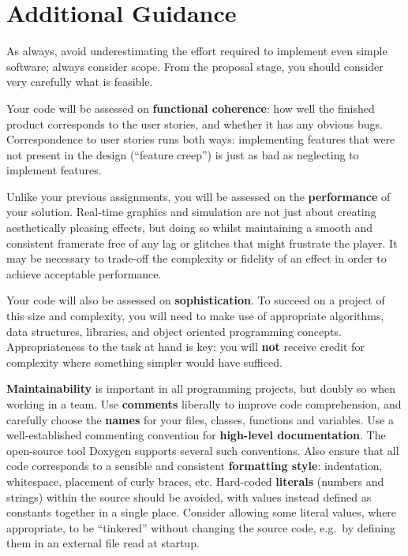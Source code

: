 \documentclass{../../fal_assignment}
\begin{document}
\section*{Additional Guidance}

As always, avoid underestimating the effort required to implement even simple software; always consider scope.
From the proposal stage, you should consider very carefully what is feasible.

Your code will be assessed on \textbf{functional coherence}:
how well the finished product corresponds to the user stories,
and whether it has any obvious bugs.
Correspondence to user stories runs both ways:
implementing features that were not present in the design (``feature creep'')
is just as bad as neglecting to implement features.

Unlike your previous assignments,
you will be assessed on the \textbf{performance} of your solution.
Real-time graphics and simulation are not just about creating aesthetically pleasing effects,
but doing so whilst maintaining a smooth and consistent framerate free of any lag or glitches that might frustrate the player.
It may be necessary to trade-off the complexity or fidelity of an effect
in order to achieve acceptable performance.

Your code will also be assessed on \textbf{sophistication}.
To succeed on a project of this size and complexity,
you will need to make use of appropriate algorithms, data structures, libraries, and object oriented programming concepts.
Appropriateness to the task at hand is key:
you will \textbf{not} receive credit for complexity  
where something simpler would have sufficed.

\textbf{Maintainability} is important in all programming projects,
but doubly so when working in a team.
Use \textbf{comments} liberally to improve code comprehension,
and carefully choose the \textbf{names} for your files, classes, functions and variables.
Use a well-established commenting convention
for \textbf{high-level documentation}.
The open-source tool Doxygen supports several such conventions.
Also ensure that all code corresponds to a sensible and consistent \textbf{formatting style}:
indentation, whitespace, placement of curly braces, etc.
Hard-coded \textbf{literals} (numbers and strings) within the source should be avoided,
with values instead defined as constants together in a single place.
Consider allowing some literal values, where appropriate, to be ``tinkered'' without changing the source code,
e.g.\ by defining them in an external file read at startup.
\end{document}
